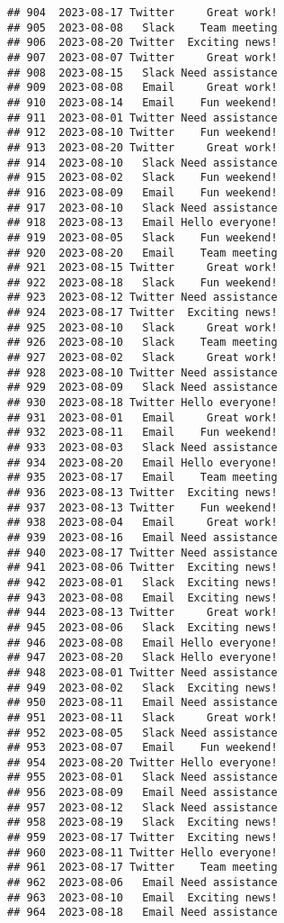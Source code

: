 \documentclass[
]{article}
\begin{document}
\begin{verbatim}
## 904  2023-08-17 Twitter     Great work!
## 905  2023-08-08   Slack    Team meeting
## 906  2023-08-20 Twitter  Exciting news!
## 907  2023-08-07 Twitter     Great work!
## 908  2023-08-15   Slack Need assistance
## 909  2023-08-08   Email     Great work!
## 910  2023-08-14   Email    Fun weekend!
## 911  2023-08-01 Twitter Need assistance
## 912  2023-08-10 Twitter    Fun weekend!
## 913  2023-08-20 Twitter     Great work!
## 914  2023-08-10   Slack Need assistance
## 915  2023-08-02   Slack    Fun weekend!
## 916  2023-08-09   Email    Fun weekend!
## 917  2023-08-10   Slack Need assistance
## 918  2023-08-13   Email Hello everyone!
## 919  2023-08-05   Slack    Fun weekend!
## 920  2023-08-20   Email    Team meeting
## 921  2023-08-15 Twitter     Great work!
## 922  2023-08-18   Slack    Fun weekend!
## 923  2023-08-12 Twitter Need assistance
## 924  2023-08-17 Twitter  Exciting news!
## 925  2023-08-10   Slack     Great work!
## 926  2023-08-10   Slack    Team meeting
## 927  2023-08-02   Slack     Great work!
## 928  2023-08-10 Twitter Need assistance
## 929  2023-08-09   Slack Need assistance
## 930  2023-08-18 Twitter Hello everyone!
## 931  2023-08-01   Email     Great work!
## 932  2023-08-11   Email    Fun weekend!
## 933  2023-08-03   Slack Need assistance
## 934  2023-08-20   Email Hello everyone!
## 935  2023-08-17   Email    Team meeting
## 936  2023-08-13 Twitter  Exciting news!
## 937  2023-08-13 Twitter    Fun weekend!
## 938  2023-08-04   Email     Great work!
## 939  2023-08-16   Email Need assistance
## 940  2023-08-17 Twitter Need assistance
## 941  2023-08-06 Twitter  Exciting news!
## 942  2023-08-01   Slack  Exciting news!
## 943  2023-08-08   Email  Exciting news!
## 944  2023-08-13 Twitter     Great work!
## 945  2023-08-06   Slack  Exciting news!
## 946  2023-08-08   Email Hello everyone!
## 947  2023-08-20   Slack Hello everyone!
## 948  2023-08-01 Twitter Need assistance
## 949  2023-08-02   Slack  Exciting news!
## 950  2023-08-11   Email Need assistance
## 951  2023-08-11   Slack     Great work!
## 952  2023-08-05   Slack Need assistance
## 953  2023-08-07   Email    Fun weekend!
## 954  2023-08-20 Twitter Hello everyone!
## 955  2023-08-01   Slack Need assistance
## 956  2023-08-09   Email Need assistance
## 957  2023-08-12   Slack Need assistance
## 958  2023-08-19   Slack  Exciting news!
## 959  2023-08-17 Twitter  Exciting news!
## 960  2023-08-11 Twitter Hello everyone!
## 961  2023-08-17 Twitter    Team meeting
## 962  2023-08-06   Email Need assistance
## 963  2023-08-10   Email  Exciting news!
## 964  2023-08-18   Email Need assistance

\end{verbatim}
\end{document}
